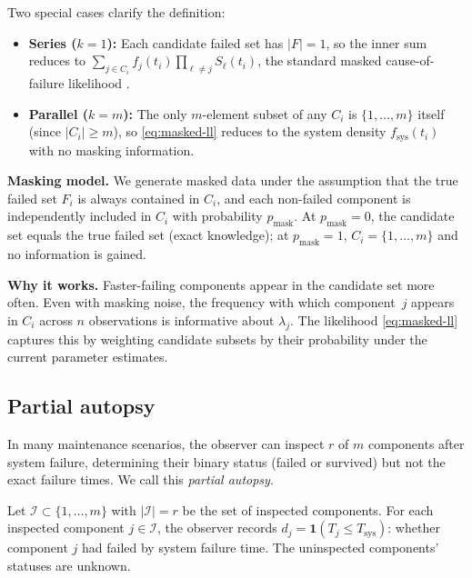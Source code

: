 \documentclass[12pt]{article}
\newcommand{\Tsys}{T_{\mathrm{sys}}}
\newcommand{\fsys}{f_{\mathrm{sys}}}
\begin{document}
Two special cases clarify the definition:
\begin{itemize}
  \item \textbf{Series ($k = 1$):}  Each candidate failed set has
    $|F| = 1$, so the inner sum reduces to
    $\sum_{j \in C_i} f_j(t_i) \prod_{\ell \neq j} S_\ell(t_i)$, the
    standard masked cause-of-failure likelihood
    \citep{Miyakawa1984,LinUsherGuess1993}.
  \item \textbf{Parallel ($k = m$):}  The only $m$-element subset of any
    $C_i$ is $\{1, \ldots, m\}$ itself (since $|C_i| \geq m$), so
    \eqref{eq:masked-ll} reduces to the system density $\fsys(t_i)$ with
    no masking information.
\end{itemize}

\textbf{Masking model.}
We generate masked data under the assumption that the true failed set
$F_i$ is always contained in $C_i$, and each non-failed component is
independently included in $C_i$ with probability $p_{\text{mask}}$.
At $p_{\text{mask}} = 0$, the candidate set equals the true failed set
(exact knowledge); at $p_{\text{mask}} = 1$, $C_i = \{1, \ldots, m\}$
and no information is gained.

\textbf{Why it works.}
Faster-failing components appear in the candidate set more often.  Even
with masking noise, the frequency with which component~$j$ appears in
$C_i$ across $n$ observations is informative about $\lambda_j$.  The
likelihood \eqref{eq:masked-ll} captures this by weighting candidate
subsets by their probability under the current parameter estimates.

\subsection{Partial autopsy}\label{sec:autopsy}

In many maintenance scenarios, the observer can inspect $r$ of $m$
components after system failure, determining their binary status
(failed or survived) but not the exact failure times.  We call this
\emph{partial autopsy}.

Let $\mathcal{I} \subset \{1, \ldots, m\}$ with $|\mathcal{I}| = r$
be the set of inspected components.  For each inspected component
$j \in \mathcal{I}$, the observer records $d_j = \mathbf{1}(T_j \leq
\Tsys)$: whether component $j$ had failed by system failure time.
The uninspected components' statuses are unknown.
\end{document}
